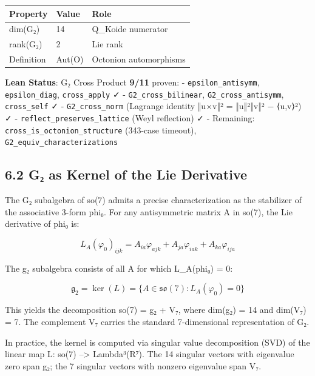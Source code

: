 \documentclass[11pt,a4paper]{article}
\begin{document}
\begin{longtable}[]{@{}lll@{}}
\toprule\noalign{}
Property & Value & Role \\
\midrule\noalign{}
\endhead
\bottomrule\noalign{}
\endlastfoot
dim(G₂) & 14 & Q\_\allowbreak{}Koide numerator \\
rank(G₂) & 2 & Lie rank \\
Definition & Aut(O) & Octonion automorphisms \\
\end{longtable}

\textbf{Lean Status}: G₂ Cross Product \textbf{9/11} proven: - \texttt{epsilon\_\allowbreak{}antisymm}, \texttt{epsilon\_\allowbreak{}diag}, \texttt{cross\_\allowbreak{}apply} ✓ - \texttt{G2\_\allowbreak{}cross\_\allowbreak{}bilinear}, \texttt{G2\_\allowbreak{}cross\_\allowbreak{}antisymm}, \texttt{cross\_\allowbreak{}self} ✓ - \texttt{G2\_\allowbreak{}cross\_\allowbreak{}norm} (Lagrange identity ‖u×v‖² = ‖u‖²‖v‖² − ⟨u,v⟩²) ✓ - \texttt{reflect\_\allowbreak{}preserves\_\allowbreak{}lattice} (Weyl reflection) ✓ - Remaining: \texttt{cross\_\allowbreak{}is\_\allowbreak{}octonion\_\allowbreak{}structure} (343-case timeout), \texttt{G2\_\allowbreak{}equiv\_\allowbreak{}characterizations}

\subsection{6.2 G₂ as Kernel of the Lie Derivative}\label{gux2082-as-kernel-of-the-lie-derivative}

The G₂ subalgebra of so(7) admits a precise characterization as the stabilizer of the associative 3-form phi₀. For any antisymmetric matrix A in so(7), the Lie derivative of phi₀ is:

\[L_A(\varphi_0)_{ijk} = A_{ia}\varphi_{ajk} + A_{ja}\varphi_{iak} + A_{ka}\varphi_{ija}\]

The g₂ subalgebra consists of all A for which L\_\allowbreak{}A(phi₀) = 0:

\[\mathfrak{g}_2 = \ker(L) = \{A \in \mathfrak{so}(7) : L_A(\varphi_0) = 0\}\]

This yields the decomposition so(7) = g₂ + V₇, where dim(g₂) = 14 and dim(V₇) = 7. The complement V₇ carries the standard 7-dimensional representation of G₂.

In practice, the kernel is computed via singular value decomposition (SVD) of the linear map L: so(7) --\textgreater{} Lambda³(R⁷). The 14 singular vectors with eigenvalue zero span g₂; the 7 singular vectors with nonzero eigenvalue span V₇.
\end{document}
